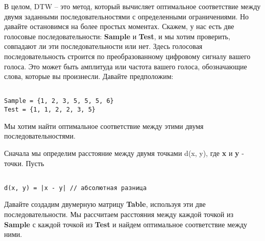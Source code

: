 \vspace{\baselineskip}
В целом, DTW – это метод, который вычисляет оптимальное соответствие между двумя заданными последовательностями с определенными ограничениями. Но давайте остановимся на более простых моментах. Скажем, у нас есть две голосовые последовательности: \textbf{Sample} и \textbf{Test}, и мы хотим проверить, совпадают ли эти последовательности или нет. Здесь голосовая последовательность строится по преобразованному цифровому сигналу вашего голоса. Это может быть амплитуда или частота вашего голоса, обозначающие слова, которые вы произнесли. Давайте предположим:


\vspace{\baselineskip}
\begin{tcolorbox}
\begin{verbatim}

Sample = {1, 2, 3, 5, 5, 5, 6}
Test = {1, 1, 2, 2, 3, 5}

\end{verbatim}
\end{tcolorbox}

\vspace{\baselineskip}
Мы хотим найти оптимальное соответствие между этими двумя последовательностями.

Сначала мы определим расстояние между двумя точками d(x, y), где \textbf{x} и \textbf{y} - точки. Пусть

\vspace{\baselineskip}
\begin{tcolorbox}
\begin{verbatim}

d(x, y) = |x - y| // абсолютная разница

\end{verbatim}
\end{tcolorbox}

\vspace{\baselineskip}
\vspace{-0.2cm}
Давайте создадим двумерную матрицу \textbf{Table}, используя эти две последовательности. Мы рассчитаем расстояния между каждой точкой из \textbf{Sample} с каждой точкой из \textbf{Test} и найдем оптимальное соответствие между ними.

